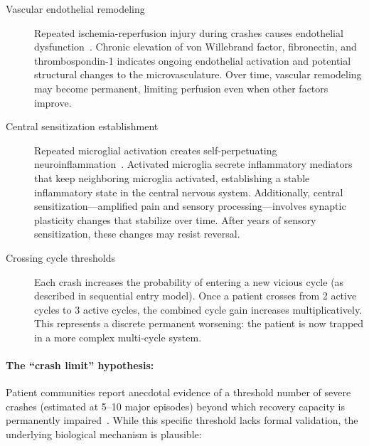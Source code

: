 \begin{description}
    \item[Vascular endothelial remodeling] Repeated ischemia-reperfusion injury during crashes causes endothelial dysfunction~\cite{heng2025mecfs}. Chronic elevation of von Willebrand factor, fibronectin, and thrombospondin-1 indicates ongoing endothelial activation and potential structural changes to the microvasculature. Over time, vascular remodeling may become permanent, limiting perfusion even when other factors improve.

    \item[Central sensitization establishment] Repeated microglial activation creates self-perpetuating neuroinflammation~\cite{Nakatomi2014neuroinflammation}. Activated microglia secrete inflammatory mediators that keep neighboring microglia activated, establishing a stable inflammatory state in the central nervous system. Additionally, central sensitization---amplified pain and sensory processing---involves synaptic plasticity changes that stabilize over time. After years of sensory sensitization, these changes may resist reversal.

    \item[Crossing cycle thresholds] Each crash increases the probability of entering a new vicious cycle (as described in sequential entry model). Once a patient crosses from 2 active cycles to 3 active cycles, the combined cycle gain increases multiplicatively. This represents a discrete permanent worsening: the patient is now trapped in a more complex multi-cycle system.
\end{description}

\paragraph{The ``crash limit'' hypothesis:}

Patient communities report anecdotal evidence of a threshold number of severe crashes (estimated at 5--10 major episodes) beyond which recovery capacity is permanently impaired~\cite{Chu2019}. While this specific threshold lacks formal validation, the underlying biological mechanism is plausible:

